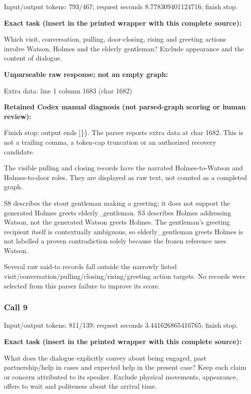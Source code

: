 Input/output tokens: 793/467; request seconds 8.778309401124716; finish stop.

\noindent\textbf{Exact task (insert in the printed wrapper with this complete source):}\par Which visit, conversation, pulling, door-closing, rising and greeting actions involve Watson, Holmes and the elderly gentleman? Exclude appearance and the content of dialogue.

\noindent\textbf{Unparseable raw response; not an empty graph:}


Extra data: line 1 column 1683 (char 1682)

\noindent\textbf{Retained Codex manual diagnosis (not parsed-graph scoring or human review):}

Finish stop; output ends ]\}\}. The parser reports extra data at char 1682. This is not a trailing comma, a token-cap truncation or an authorized recovery candidate.

The visible pulling and closing records have the narrated Holmes-to-Watson and Holmes-to-door roles. They are displayed as raw text, not counted as a completed graph.\par

S8 describes the stout gentleman making a greeting; it does not support the generated Holmes greets elderly\_gentleman. S3 describes Holmes addressing Watson, not the generated Watson greets Holmes. The gentleman's greeting recipient itself is contextually ambiguous, so elderly\_gentleman greets Holmes is not labelled a proven contradiction solely because the frozen reference uses Watson.\par

Several raw said-to records fall outside the narrowly listed visit/conversation/pulling/closing/rising/greeting action targets. No records were selected from this parser failure to improve its score.\par

\subsubsection*{Call 9}

Input/output tokens: 811/139; request seconds 3.441626865416765; finish stop.

\noindent\textbf{Exact task (insert in the printed wrapper with this complete source):}\par What does the dialogue explicitly convey about being engaged, past partnership/help in cases and expected help in the present case? Keep each claim or concern attributed to its speaker. Exclude physical movements, appearance, offers to wait and politeness about the arrival time.

